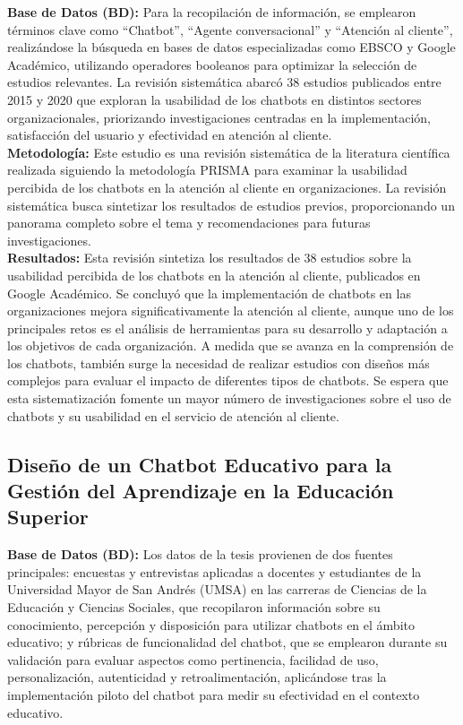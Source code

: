 \documentclass[10pt,a4paper]{article}
\begin{document}
\textbf{Base de Datos (BD):} Para la recopilación de información, se emplearon términos clave como “Chatbot”, “Agente conversacional” y “Atención al cliente”, realizándose la búsqueda en bases de datos especializadas como EBSCO y Google Académico, utilizando operadores booleanos para optimizar la selección de estudios relevantes. La revisión sistemática abarcó 38 estudios publicados entre 2015 y 2020 que exploran la usabilidad de los chatbots en distintos sectores organizacionales, priorizando investigaciones centradas en la implementación, satisfacción del usuario y efectividad en atención al cliente. \\

\textbf{Metodología:} Este estudio es una revisión sistemática de la literatura científica realizada siguiendo la metodología PRISMA para examinar la usabilidad percibida de los chatbots en la atención al cliente en organizaciones. La revisión sistemática busca sintetizar los resultados de estudios previos, proporcionando un panorama completo sobre el tema y recomendaciones para futuras investigaciones. \\

\textbf{Resultados:} Esta revisión sintetiza los resultados de 38 estudios sobre la usabilidad percibida de los chatbots en la atención al cliente, publicados en Google Académico. Se concluyó que la implementación de chatbots en las organizaciones mejora significativamente la atención al cliente, aunque uno de los principales retos es el análisis de herramientas para su desarrollo y adaptación a los objetivos de cada organización. A medida que se avanza en la comprensión de los chatbots, también surge la necesidad de realizar estudios con diseños más complejos para evaluar el impacto de diferentes tipos de chatbots. Se espera que esta sistematización fomente un mayor número de investigaciones sobre el uso de chatbots y su usabilidad en el servicio de atención al cliente. \\


\subsection{Diseño de un Chatbot Educativo para la Gestión del Aprendizaje en la Educación Superior}

\textbf{Base de Datos (BD):} Los datos de la tesis provienen de dos fuentes principales: encuestas y entrevistas aplicadas a docentes y estudiantes de la Universidad Mayor de San Andrés (UMSA) en las carreras de Ciencias de la Educación y Ciencias Sociales, que recopilaron información sobre su conocimiento, percepción y disposición para utilizar chatbots en el ámbito educativo; y rúbricas de funcionalidad del chatbot, que se emplearon durante su validación para evaluar aspectos como pertinencia, facilidad de uso, personalización, autenticidad y retroalimentación, aplicándose tras la implementación piloto del chatbot para medir su efectividad en el contexto educativo. \\
\end{document}
